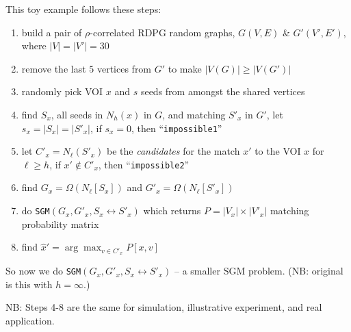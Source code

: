 \documentclass[]{article}
\providecommand{\tightlist}{%
  \setlength{\itemsep}{0pt}\setlength{\parskip}{0pt}}
\begin{document}
This toy example follows these steps:

\begin{enumerate}
\def\labelenumi{\arabic{enumi}.}
\tightlist
\item
  build a pair of \(\rho\)-correlated RDPG random graphs, \(G(V,E)\) \&
  \(G'(V',E')\), where \(|V|=|V'|=30\)
\item
  remove the last \(5\) vertices from \(G'\) to make
  \(|V(G)| \geq |V(G')|\)
\item
  randomly pick VOI \(x\) and \(s\) seeds from amongst the shared
  vertices
\item
  find \(S_x\), all seeds in \(N_h(x)\) in \(G\), and matching \(S'_x\)
  in \(G'\), let \(s_x = |S_x| = |S'_x|\), if \(s_x=0\), then
  ``\texttt{impossible1}''
\item
  let \(C'_x = N_\ell(S'_x)\) be the \emph{candidates} for the match
  \(x'\) to the VOI \(x\) for \(\ell\geq h\), if \(x' \notin C'_x\),
  then ``\texttt{impossible2}''
\item
  find \(G_x = \Omega(N_\ell[S_x])\) and \(G'_x = \Omega(N_\ell[S'_x])\)
\item
  do \texttt{SGM}\((G_x, G'_x, S_x \leftrightarrow S'_x)\) which returns
  \(P=|V_x| \times |V'_x|\) matching probability matrix
\item
  find \(\hat{x}' = \arg\max_{v \in {C'_x}} P[x,v]\)
\end{enumerate}

So now we do \texttt{SGM}\((G_x,G'_x,S_x \leftrightarrow S'_x)\) -- a
smaller SGM problem. (NB: original is this with \(h=\infty\).)

NB: Steps 4-8 are the same for simulation, illustrative experiment, and
real application.
\end{document}
